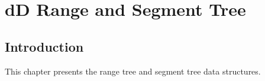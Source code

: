 \def\ccTagRmEigenClassName{\ccFalse}
\def\ccLongParamLayout{\ccTrue}

\ccThreeToTwo

\chapter{dD Range and Segment Tree} 
\label{Trees}



\section{Introduction}

This chapter presents the {\cgal} range tree and segment tree
data structures. 








